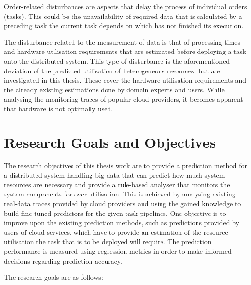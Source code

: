             Order-related disturbances are aspects that delay the process of individual orders (tasks).
            This could be the unavailability of required data that is calculated by a preceding task the current task depends on which has not finished its execution.

            The disturbance related to the measurement of data is that of processing times and hardware utilisation requirements that are estimated before deploying a task onto the distributed system. 
            This type of disturbance is the aforementioned deviation of the predicted utilisation of heterogeneous resources that are investigated in this thesis. These cover the hardware utilisation requirements and the already existing estimations done by domain experts and users. While analysing the monitoring traces of popular cloud providers, it becomes apparent that hardware is not optimally used.


        
        \section{Research Goals and Objectives}
        \label{sec:research-objectives-introduction}

            The research objectives of this thesis work are to provide a prediction method for a distributed system handling big data that can predict how much system resources are necessary and provide a rule-based analyser that monitors the system components for over-utilisation.
            This is achieved by analysing existing real-data traces provided by cloud providers and using the gained knowledge to build fine-tuned predictors for the given task pipelines. One objective is to improve upon the existing prediction methods, such as predictions provided by users of cloud services, which have to provide an estimation of the resource utilisation the task that is to be deployed will require. 
            The prediction performance is measured using regression metrics in order to make informed decisions regarding prediction accuracy.

            The research goals are as follows:

